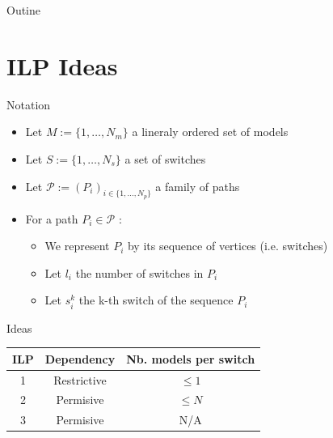 \documentclass[8pt]{beamer}
\begin{document}
\begin{frame}{Outine}
    \tableofcontents
\end{frame}


\section{ILP Ideas}
\begin{frame}{Notation}
    \begin{itemize}
        \item Let $M := \{1,\dotsc,N_m\}$ a lineraly ordered set of models
        \item Let $S := \{1,\dotsc,N_s\}$ a set of switches
        \item Let $\mathcal{P} := (P_i)_{i \in \{1,\dotsc,N_p\}}$ a family of paths
        \item For a path $P_i \in \mathcal{P}$ :
            \begin{itemize}
                \item We represent $P_i$ by its sequence of vertices (i.e. switches)
                \item Let $l_i$ the number of switches in $P_i$
                \item Let $s_i^k$ the k-th switch of the sequence $P_i$
            \end{itemize}
    \end{itemize}
\end{frame}

\begin{frame}{Ideas}
    \begin{table}
        \begin{tabular}{|c||c|c|}
            \hline
            ILP & Dependency & Nb. models per switch \\
            \hline \hline
            1 & Restrictive & $\leq 1$ \\
            \hline
            2 & Permisive & $\leq N$ \\
            \hline
            3 & Permisive & N/A \\
            \hline
        \end{tabular}
    \end{table}
\end{frame}
\end{document}

